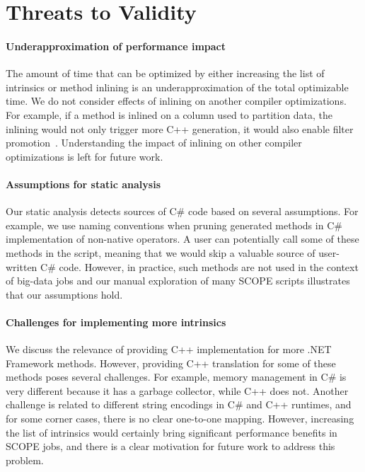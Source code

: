 \section{Threats to Validity}

\paragraph{Underapproximation of performance impact}
The amount of time that can be optimized by either increasing the list of intrinsics or method inlining is an underapproximation of the total optimizable time.
We do not consider effects of inlining on another compiler optimizations.
For example, if a method is inlined on a column used to partition data, the inlining would not only trigger more C++ generation, it would also enable filter promotion~\cite{Darlington78}.
Understanding the impact of inlining on other compiler optimizations is left for future work.

\paragraph{Assumptions for static analysis}
Our static analysis detects sources of C\# code based on several assumptions.
For example, we use naming conventions when pruning generated methods in C\# implementation of non-native operators.
A user can potentially call some of these methods in the script, meaning that we would skip a valuable source of user-written C\# code.
However, in practice, such methods are not used in the context of big-data jobs and our manual exploration of many SCOPE scripts illustrates that our assumptions hold.

\paragraph{Challenges for implementing more intrinsics}
We discuss the relevance of providing C++ implementation for more .NET Framework methods.
However, providing C++ translation for some of these methods poses several challenges.
For example, memory management in C\# is very different because it has a garbage collector, while C++ does not.
Another challenge is related to different string encodings in C\# and C++ runtimes, and for some corner cases, there is no clear one-to-one mapping.
However, increasing the list of intrinsics would certainly bring significant performance benefits in SCOPE jobs, and there is a clear motivation for future work to address this problem.  
